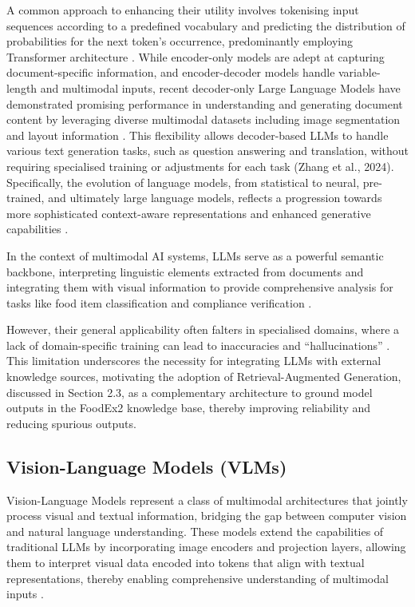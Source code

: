A common approach to enhancing their utility involves tokenising input sequences according to a predefined vocabulary and predicting the distribution of probabilities for the next token's occurrence, predominantly employing Transformer architecture \parencite{yuki_imajuku_f8c4877b}. While encoder-only models are adept at capturing document-specific information, and encoder-decoder models handle variable-length and multimodal inputs, recent decoder-only Large Language Models have demonstrated promising performance in understanding and generating document content by leveraging diverse multimodal datasets including image segmentation and layout information \parencite{weishi_wang_67b85d63}. This flexibility allows decoder-based LLMs to handle various text generation tasks, such as question answering and translation, without requiring specialised training or adjustments for each task (Zhang et al., 2024). Specifically, the evolution of language models, from statistical to neural, pre-trained, and ultimately large language models, reflects a progression towards more sophisticated context-aware representations and enhanced generative capabilities \parencite{pengfei_zhou_b2203b1e}.

In the context of multimodal AI systems, LLMs serve as a powerful semantic backbone, interpreting linguistic elements extracted from documents and integrating them with visual information to provide comprehensive analysis for tasks like food item classification and compliance verification \parencite{yutong_zhang_e47bed88,chaoyang_zhu_ed468d29}.

However, their general applicability often falters in specialised domains, where a lack of domain-specific training can lead to inaccuracies and ``hallucinations'' \parencite{mohbat_tharani_ccbd7a9f}. This limitation underscores the necessity for integrating LLMs with external knowledge sources, motivating the adoption of Retrieval-Augmented Generation, discussed in Section 2.3, as a complementary architecture to ground model outputs in the FoodEx2 knowledge base, thereby improving reliability and reducing spurious outputs.

\hypertarget{vision-language-models-vlms}{%
\subsection{Vision-Language Models (VLMs)}\label{vision-language-models-vlms}}

Vision-Language Models represent a class of multimodal architectures that jointly process visual and textual information, bridging the gap between computer vision and natural language understanding. These models extend the capabilities of traditional LLMs by incorporating image encoders and projection layers, allowing them to interpret visual data encoded into tokens that align with textual representations, thereby enabling comprehensive understanding of multimodal inputs \parencite{zhipei_xu_621e96fd}.

